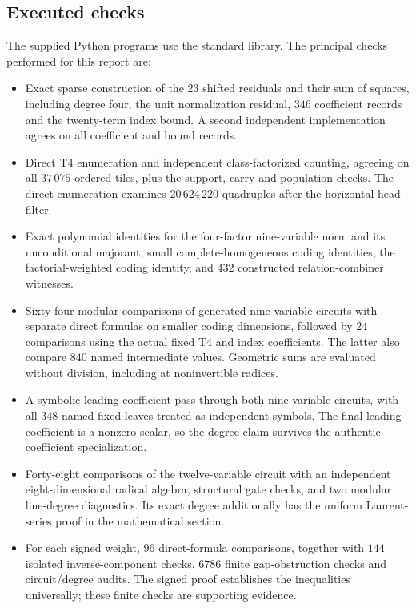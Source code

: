 \documentclass[11pt,a4paper]{article}
\theoremstyle{remark}
\begin{document}
\subsection{Executed checks}

The supplied Python programs use the standard library.  The principal
checks performed for this report are:
\begin{itemize}
\item Exact sparse construction of the $23$ shifted residuals and their
sum of squares, including degree four, the unit normalization residual,
$346$ coefficient records and the twenty-term index bound.  A second
independent implementation agrees on all coefficient and bound records.
\item Direct T4 enumeration and independent class-factorized counting,
agreeing on all $37\,075$ ordered tiles, plus the support, carry and
population checks.  The direct enumeration examines $20\,624\,220$
quadruples after the horizontal head filter.
\item Exact polynomial identities for the four-factor nine-variable
norm and its unconditional majorant, small complete-homogeneous coding
identities, the factorial-weighted coding identity, and $432$ constructed
relation-combiner witnesses.
\item Sixty-four modular comparisons of generated nine-variable circuits
with separate direct formulas on smaller coding dimensions, followed by
$24$ comparisons using the actual fixed T4 and index coefficients.
The latter also compare $840$ named intermediate values.  Geometric
sums are evaluated without division, including at noninvertible radices.
\item A symbolic leading-coefficient pass through both nine-variable
circuits, with all $348$ named fixed leaves treated as independent
symbols.  The final leading coefficient is a nonzero scalar, so the
degree claim survives the authentic coefficient specialization.
\item Forty-eight comparisons of the twelve-variable circuit with an
independent eight-dimensional radical algebra, structural gate checks,
and two modular line-degree diagnostics.  Its exact degree additionally
has the uniform Laurent-series proof in the mathematical section.
\item For each signed weight, $96$ direct-formula comparisons, together
with $144$ isolated inverse-component checks, $6786$ finite gap-obstruction
checks and circuit/degree audits.  The signed proof establishes the
inequalities universally; these finite checks are supporting evidence.
\end{itemize}
\end{document}
